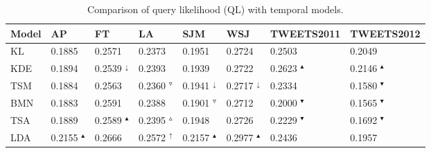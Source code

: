 \documentclass{sig-alternate}
\begin{document}
\begin{table*}[t]
\small
\caption{Comparison of query likelihood (QL) with temporal models. }
\begin{center}
\tabcolsep=0.11cm
\begin{tabular}{| l | l | l | l | l | l | l | l |}
\hline
\bf{Model}& \bf{AP} & \bf{FT} & \bf{LA} & \bf{SJM} & \bf{WSJ} & \bf{TWEETS2011} & \bf{TWEETS2012} \\ \hline 
KL & 0.1885  & 0.2571  & 0.2373  & 0.1951  & 0.2724  & 0.2503  & 0.2049 \\ \hline  \hline
KDE & 0.1894  & 0.2539 $^{\downarrow}$  & 0.2393  & 0.1939  & 0.2722  & 0.2623 $^{\blacktriangle}$  & 0.2146 $^{\blacktriangle}$ \\ \hline 
TSM & 0.1884  & 0.2563  & 0.2360 $^{\triangledown}$  & 0.1941 $^{\downarrow}$  & 0.2717 $^{\downarrow}$  & 0.2334  & 0.1580 $^{\blacktriangledown}$ \\ \hline 
BMN & 0.1883  & 0.2591  & 0.2388  & 0.1901 $^{\triangledown}$  & 0.2712  & 0.2000 $^{\blacktriangledown}$  & 0.1565 $^{\blacktriangledown}$ \\ \hline 
TSA & 0.1889  & 0.2589 $^{\blacktriangle}$  & 0.2395 $^{\vartriangle}$  & 0.1948  & 0.2726  & 0.2229 $^{\blacktriangledown}$  & 0.1692 $^{\blacktriangledown}$ \\ \hline
LDA & 0.2155 $^{\blacktriangle}$  & 0.2666  & 0.2572 $^{\uparrow}$  & 0.2157 $^{\blacktriangle}$  & 0.2977 $^{\blacktriangle}$  & 0.2436  & 0.1957 \\ \hline  
\end{tabular}
\end{center}
\label{table.results.ql}
\normalsize
\end{table*}
\end{document}
